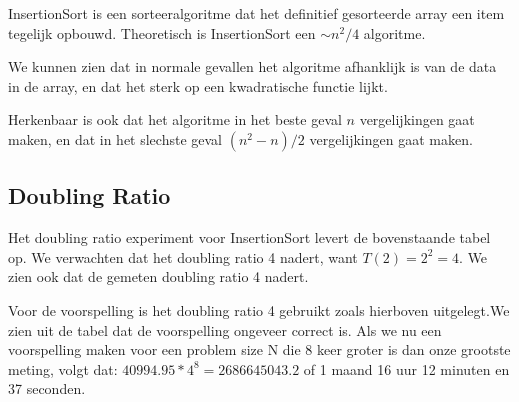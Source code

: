 InsertionSort is een sorteeralgoritme dat het definitief gesorteerde array een item tegelijk opbouwd. Theoretisch is InsertionSort een \(\sim n^{2}/4\) algoritme.

We kunnen zien dat in normale gevallen het algoritme afhanklijk is van de data in de array, en dat het sterk op een kwadratische functie lijkt.

Herkenbaar is ook dat het algoritme in het beste geval \(n\) vergelijkingen gaat maken, en dat in het slechste geval \((n^2 - n)/2\) vergelijkingen gaat maken.

\subsection{Doubling Ratio}


Het doubling ratio experiment voor InsertionSort levert de bovenstaande tabel op. We verwachten dat het doubling ratio 4 nadert, want \(T(2)=2^2=4\). We zien ook dat de gemeten doubling ratio 4 nadert.



Voor de voorspelling is het doubling ratio 4 gebruikt zoals hierboven uitgelegt.We zien uit de tabel dat de voorspelling ongeveer correct is. Als we nu een voorspelling maken voor een problem size N die 8 keer groter is dan onze grootste meting, volgt dat: \(40994.95*4^8=2686645043.2\) of 1 maand 16 uur 12 minuten en 37 seconden.
